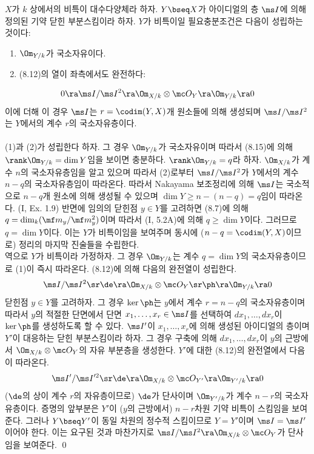 	
	\begin{theorem}
	$X$가 $k$ 상에서의 비특이 대수다양체라 하자. $Y\bseq X$가 아이디얼의 층 $\ms I$에 의해 정의된 기약 닫힌 부분스킴이라 하자.
	$Y$가 비특이일 필요충분조건은 다음이 성립하는 것이다:\\
	\begin{enumerate}[label=(\arabic*)]
	\item $\Om_{Y/k}$가 국소자유이다.
	\item (8.12)의 열이 좌측에서도 완전하다:
	\end{enumerate}
	$$0\ra\ms I/\ms I^2\ra\Om_{X/k}\otimes\mc O_Y\ra\Om_{Y/k}\ra 0$$
	이에 더해 이 경우 $\ms I$는 $r=\codim(Y,X)$개 원소들에 의해 생성되며 $\ms I/\ms I^2$는 $Y$에서의 계수 $r$의 국소자유층이다.\\\\
	\pf (1)과 (2)가 성립한다 하자. 그 경우 $\Om_{Y/k}$가 국소자유이며 따라서 (8.15)에 의해 $\rank\Om_{Y/k}=\dim Y$임을 보이면 충분하다.
	$\rank\Om_{Y/k}=q$라 하자. $\Om_{X/k}$가 계수 $n$의 국소자유층임을 알고 있으며
	따라서 (2)로부터 $\ms I/\ms I^2$가 $Y$에서의 계수 $n-q$의 국소자유층임이 따라온다.
	따라서 Nakayama 보조정리에 의해 $\ms I$는 국소적으로 $n-q$개 원소에 의해 생성될 수 있으며
	$\dim Y\ge n-(n-q)=q$임이 따라온다. (I, Ex. 1.9)
	반면에 임의의 닫힌점 $y\in Y$를 고려하면 (8.7)에 의해 $q=\dim_k(\mf m_y/\mf m_y^2)$이며 따라서 (I, 5.2A)에 의해 $q\ge\dim Y$이다.
	그러므로 $q=\dim Y$이다. 이는 $Y$가 비특이임을 보여주며 동시에 ($n-q=\codim(Y,X)$이므로) 정리의 마지막 진술들을 수립한다.\\
	역으로 $Y$가 비특이라 가정하자. 그 경우 $\Om_{Y/k}$는 계수 $q=\dim Y$의 국소자유층이므로 (1)이 즉시 따라온다.
	(8.12)에 의해 다음의 완전열이 성립한다.
	$$\ms I/\ms I^2\sr\de\ra\Om_{X/k}\otimes\mc O_Y\sr\ph\ra\Om_{Y/k}\ra 0$$
	닫힌점 $y\in Y$를 고려하자. 그 경우 $\ker\ph$는 $y$에서 계수 $r=n-q$의 국소자유층이며
	따라서 $y$의 적절한 단면에서 단면 $x_1,\ldots,x_r\in\ms I$를 선택하여 $dx_1,\ldots,dx_r$이 $\ker\ph$를 생성하도록 할 수 있다.
	$\ms I'$이 $x_1,\ldots,x_r$에 의해 생성된 아이디얼의 층이며 $Y'$이 대응하는 닫힌 부분스킴이라 하자.
	그 경우 구축에 의해 $dx_1,\ldots,dx_r$이 $y$의 근방에서 $\Om_{X/k}\otimes\mc O_Y$의 자유 부분층을 생성한다.
	$Y'$에 대한 (8.12)의 완전열에서 다음이 따라온다.
	$$\ms I'/\ms I'^2\sr\de\ra\Om_{X/k}\otimes\mc O_{Y'}\ra\Om_{Y'/k}\ra 0$$
	($\de$의 상이 계수 $r$의 자유층이므로) $\de$가 단사이며 $\Om_{Y'/k}$가 계수 $n-r$의 국소자유층이다.
	증명의 앞부분은 $Y'$이 ($y$의 근방에서) $n-r$차원 기약 비특이 스킴임을 보여준다.
	그러나 $Y\bseq Y'$이 동일 차원의 정수적 스킴이므로 $Y=Y'$이며 $\ms I=\ms I'$이어야 한다.
	이는 요구된 것과 마찬가지로 $\ms I/\ms I^2\ra\Om_{X/k}\otimes\mc O_Y$가 단사임을 보여준다.
	\qed
	\end{theorem}
	
